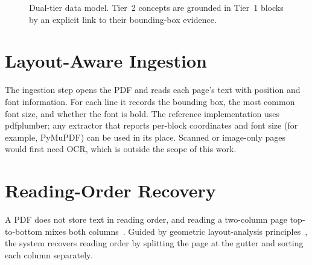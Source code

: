 \documentclass[12pt,a4paper,twoside,openright]{report}
\begin{document}
\begin{figure}[!htbp]
\centering
{}
\caption{Dual-tier data model. Tier~2 concepts are grounded in Tier~1 blocks by an
explicit link to their bounding-box evidence.}
\label{fig:dualtier}
\end{figure}

\section{Layout-Aware Ingestion}
The ingestion step opens the PDF and reads each page's text with position and font
information. For each line it records the bounding box, the most common font size, and
whether the font is bold. The reference implementation uses pdfplumber; any extractor
that reports per-block coordinates and font size (for example, PyMuPDF) can be used in
its place. Scanned or image-only pages would first need OCR, which is outside the scope
of this work.

\section{Reading-Order Recovery}
A PDF does not store text in reading order, and reading a two-column page top-to-bottom
mixes both columns~\cite{huang2022layoutlmv3}. Guided by geometric layout-analysis
principles~\cite{ogorman1993document,breuel2002high}, the system recovers reading order
by splitting the page at the gutter and sorting each column separately.
\end{document}
